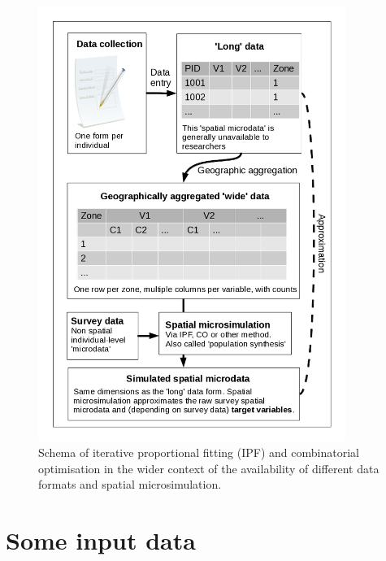 \documentclass[a4paper, 11pt, twoside]{article}
\begin{document}
\begin{figure}
\begin{center}
  \includegraphics[width=10cm]{msim-schema}
\end{center}

\caption{Schema of iterative proportional fitting (IPF) and combinatorial optimisation
in the wider context of the availability of different data formats and spatial microsimulation. \label{fmsim-schema}}
\end{figure}

\section{Some input data} \label{s:theory}
\end{document}

